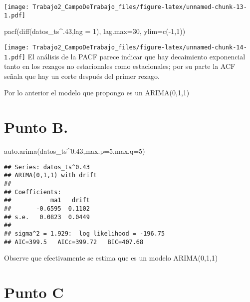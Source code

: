 \documentclass[
]{article}
\newenvironment{Shaded}{\begin{snugshade}}{\end{snugshade}}
\newcommand{\AttributeTok}[1]{\textcolor[rgb]{0.77,0.63,0.00}{#1}}
\newcommand{\DecValTok}[1]{\textcolor[rgb]{0.00,0.00,0.81}{#1}}
\newcommand{\FloatTok}[1]{\textcolor[rgb]{0.00,0.00,0.81}{#1}}
\newcommand{\FunctionTok}[1]{\textcolor[rgb]{0.00,0.00,0.00}{#1}}
\newcommand{\NormalTok}[1]{#1}
\newcommand{\SpecialCharTok}[1]{\textcolor[rgb]{0.00,0.00,0.00}{#1}}
\begin{document}
\texttt{[image: Trabajo2\_CampoDeTrabajo\_files/figure-latex/unnamed-chunk-13-1.pdf]}

\begin{Shaded}
\begin{Highlighting}[]
\FunctionTok{pacf}\NormalTok{(}\FunctionTok{diff}\NormalTok{(datos\_ts}\SpecialCharTok{\^{}}\NormalTok{.}\DecValTok{43}\NormalTok{,}\AttributeTok{lag =} \DecValTok{1}\NormalTok{), }\AttributeTok{lag.max=}\DecValTok{30}\NormalTok{, }\AttributeTok{ylim=}\FunctionTok{c}\NormalTok{(}\SpecialCharTok{{-}}\DecValTok{1}\NormalTok{,}\DecValTok{1}\NormalTok{))}
\end{Highlighting}
\end{Shaded}

\texttt{[image: Trabajo2\_CampoDeTrabajo\_files/figure-latex/unnamed-chunk-14-1.pdf]}
El análisis de la PACF parece indicar que hay decaimiento exponencial
tanto en los rezagos no estacionales como estacionales; por su parte la
ACF señala que hay un corte después del primer rezago.

Por lo anterior el modelo que propongo es un ARIMA(0,1,1)

\hypertarget{punto-b.}{%
\section{Punto B.}\label{punto-b.}}

\begin{Shaded}
\begin{Highlighting}[]
\FunctionTok{auto.arima}\NormalTok{(datos\_ts}\SpecialCharTok{\^{}}\FloatTok{0.43}\NormalTok{,}\AttributeTok{max.p=}\DecValTok{5}\NormalTok{,}\AttributeTok{max.q=}\DecValTok{5}\NormalTok{)}
\end{Highlighting}
\end{Shaded}

\begin{verbatim}
## Series: datos_ts^0.43 
## ARIMA(0,1,1) with drift 
## 
## Coefficients:
##           ma1   drift
##       -0.6595  0.1102
## s.e.   0.0823  0.0449
## 
## sigma^2 = 1.929:  log likelihood = -196.75
## AIC=399.5   AICc=399.72   BIC=407.68
\end{verbatim}

Observe que efectivamente se estima que es un modelo ARIMA(0,1,1)

\hypertarget{punto-c}{%
\section{Punto C}\label{punto-c}}
\end{document}
